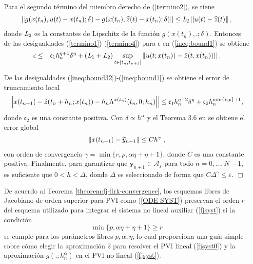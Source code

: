 Para el segundo término del miembro derecho de (\ref{termino2}), se tiene
\begin{equation}
    \left\lVert g(x(t_n),u(t)-x(t_n);\delta)-g(x(t_n),\widehat{z}(t)-x(t_n);\delta) \right\rVert \leq  \emph{L}_2\left\lVert u(t)-\widehat{z}(t) \right\rVert,
    \label{termino4}
\end{equation}
donde $\emph{L}_2$ es la constantes de Lipschitz de la función $g(x(t_n),.;\delta)$. Entonces de las desigualdades (\ref{termino1})-(\ref{termino4}) para $\epsilon$ en (\ref{ineq:bound1}) se obtiene
\begin{eqnarray*}
	\epsilon & \leq & \mathfrak{c}_1 h_n^{\eta+1}\delta^{\eta} +  (\emph{L}_1+\emph{L}_2) \sup\limits_{t\in[t_n,t_{n+1}]} \left\lVert u(t;x(t_n))-\hat{z}(t,x(t_n)) \right\rVert.
\end{eqnarray*}

De las desigualdades (\ref{ineq:bound32})-(\ref{ineq:bound1}) se obtiene el error de truncamiento local
\begin{equation*}
    \left\lVert x(t_{n+1})-\hat{z}(t_n+h_n;x(t_n))-h_n\Lambda^{x(t_n)}(t_n,0;h_n) \right\rVert\leq \mathfrak{c}_1 h_n^{\eta+2}\delta^{\eta} + \mathfrak{c}_2 h_n^{\min\{r,p\}+1},
\end{equation*}
donde $\mathfrak{c}_2$ es una constante positiva. Con $\delta\propto h^{\alpha}$ y el Teorema 3.6 en \cite{hairer1993solving} se obtiene el error global
\begin{equation*}
    \left\lVert x(t_{n+1})-\widetilde{y}_{n+1} \right\rVert\leq Ch^\gamma \;,
\end{equation*}
con orden de convergencia  $\gamma = \min\{r,p,\alpha\eta+\eta+1\}$, donde $C$ es una constante positiva. Finalmente, para garantizar que
$\mathbf{y}_{n+1}\in \mathcal{A}_{\varepsilon }$
para todo $n=0,...,N-1$, es suficiente que  $0<h<\Delta $, donde  $\Delta$ es seleccionado de forma que  $C\Delta ^{\gamma
}\leq \varepsilon $. $\Box$

De acuerdo al Teorema \ref{theorem:fj-llrk-convergence}, los esquemas libres de Jacobiano de orden superior para PVI como (\ref{ODE-SYST}) preservan el orden $r$ del esquema utilizado para integrar el sistema no lineal auxiliar (\ref{fjsyst}) si la condición
\begin{equation*}
    \min\{p,\alpha\eta+\eta+1\} \geq r
\end{equation*}
se cumple para los parámetros libres $p,\alpha,\eta$, lo cual proporciona una guía simple sobre cómo elegir la aproximación $\widehat{z}$ para resolver el PVI lineal (\ref{fjsyst0}) y la aproximación $g(.;h^{\alpha}_n)$ en el PVI no lineal (\ref{fjsyst}).

